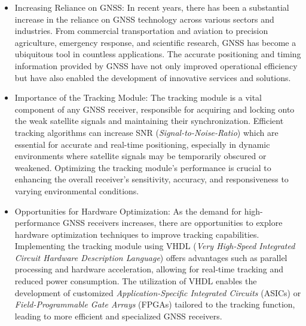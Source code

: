 \begin{itemize}
    \item Increasing Reliance on GNSS: In recent years, there has been a substantial increase in the reliance on GNSS technology across various sectors and industries. From commercial transportation and aviation to precision agriculture, emergency response, and scientific research, GNSS has become a ubiquitous tool in countless applications. The accurate positioning and timing information provided by GNSS have not only improved operational efficiency but have also enabled the development of innovative services and solutions.
    \item Importance of the Tracking Module: The tracking module is a vital component of any GNSS receiver, responsible for acquiring and locking onto the weak satellite signals and maintaining their synchronization. Efficient tracking algorithms can increase SNR (\textit{Signal-to-Noise-Ratio}) which are essential for accurate and real-time positioning, especially in dynamic environments where satellite signals may be temporarily obscured or weakened. Optimizing the tracking module's performance is crucial to enhancing the overall receiver's sensitivity, accuracy, and responsiveness to varying environmental conditions.
    \item Opportunities for Hardware Optimization: As the demand for high-performance GNSS receivers increases, there are opportunities to explore hardware optimization techniques to improve tracking capabilities. Implementing the tracking module using VHDL (\textit{Very High-Speed Integrated Circuit Hardware Description Language}) offers advantages such as parallel processing and hardware acceleration, allowing for real-time tracking and reduced power consumption. The utilization of VHDL enables the development of customized \textit{Application-Specific Integrated Circuits} (ASICs) or \textit{Field-Programmable Gate Arrays} (FPGAs) tailored to the tracking function, leading to more efficient and specialized GNSS receivers.
\end{itemize}


